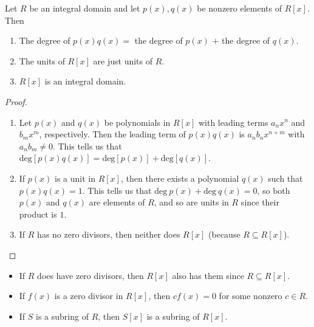 \begin{prop}
    Let \( R  \) be an integral domain and let \( p(x) , q(x) \) be nonzero elements of \( R[x] \). Then
    \begin{enumerate}
        \item[(1)] The degree of \( p(x)q(x) =  \) the degree of \( p(x)  \) \( + \) the degree of \( q(x) \). 
        \item[(2)] The units of \( R[x] \) are just units of \( R  \).
        \item[(3)] \( R[x] \) is an integral domain.
    \end{enumerate}
\end{prop}
\begin{proof}
    \begin{enumerate}
        \item[(1)] Let \( p(x) \) and \( q(x) \) be polynomials in \( R[x] \) with leading terms \( {a}_{n}x^{n} \) and \( {b}_{m} x^{m} \), respectively. Then the leading term of \( p(x)q(x)  \) is \( {a}_{n}{b}_{n}  x^{n+m} \) with \( {a}_{n}{b}_{m} \neq 0 \). This tells us that \( \text{deg}[p(x)q(x)] = \text{deg}[p(x)] + \text{deg}[q(x)]    \).
        \item[(2)] If \( p(x) \) is a unit in \( R[x] \), then there exists a  polynomial \( q(x) \) such that \( p(x)q(x) = 1  \). This tells us that \( \text{deg} \ p(x) + \text{deg} \ q(x) = 0    \), so both \( p(x) \) and \( q(x)  \) are elements of \( R  \), and so are units in \( R  \) since their product is \( 1  \). 
        \item[(3)] If \( R  \) has no zero divisors, then neither does \( R[x] \) (because \( R \subseteq R[x] \)).
    \end{enumerate}
\end{proof}

\begin{itemize}
    \item If \( R  \) does have zero divisors, then \( R[x] \) also has them since \( R \subseteq R[x] \).
    \item If \( f(x)  \) is a zero divisor in \( R[x] \), then \(c f(x) = 0  \) for some nonzero \( c \in R  \).
    \item If \( S  \) is a subring of \( R  \), then \( S[x]  \) is a subring of \( R[x] \).
\end{itemize}

